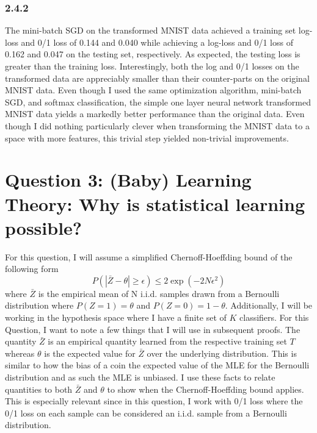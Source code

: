 \documentclass[12pt]{amsart}
\begin{document}
\subsubsection*{2.4.2}

The mini-batch SGD on the transformed MNIST data achieved a training set log-loss and 0/1 loss of 0.144 and 0.040 while achieving a log-loss and 0/1 loss of 0.162 and 0.047 on the testing set, respectively.  As expected, the testing loss is greater than the training loss.  Interestingly, both the log and 0/1 losses on the transformed data are appreciably smaller than their counter-parts on the original MNIST data.  Even though I used the same optimization algorithm, mini-batch SGD, and softmax classification, the simple one layer neural network transformed MNIST data yields a markedly better performance than the original data.  Even though I did nothing particularly clever when transforming the MNIST data to a space with more features, this trivial step yielded non-trivial improvements.

\section*{Question 3: (Baby) Learning Theory: Why is statistical learning possible?}

For this question, I will assume a simplified Chernoff-Hoeffding bound of the following form
\begin{equation} \label{eqn:ch_bound}
P(|\bar{Z} - \theta| \geq \epsilon) \leq 2 \exp(-2N \epsilon^2)
\end{equation}
where $\bar{Z}$ is the empirical mean of N i.i.d. samples drawn from a Bernoulli distribution where $P(Z = 1) = \theta$ and $P(Z = 0) = 1 - \theta$.  Additionally, I will be working in the hypothesis space where I have a finite set of $K$ classifiers.  For this Question, I want to note a few things that I will use in subsequent proofs.  The quantity $\bar{Z}$ is an empirical quantity learned from the respective training set $T$ whereas $\theta$ is the expected value for $\bar{Z}$ over the underlying distribution.  This is similar to how the bias of a coin the expected value of the MLE for the Bernoulli distribution and as such the MLE is unbiased.  I use these facts to relate quantities to both $\bar{Z}$ and $\theta$ to show when the Chernoff-Hoeffding bound applies.  This is especially relevant since in this question, I work with 0/1 loss where the 0/1 loss on each sample can be considered an i.i.d. sample from a Bernoulli distribution.
\end{document}
